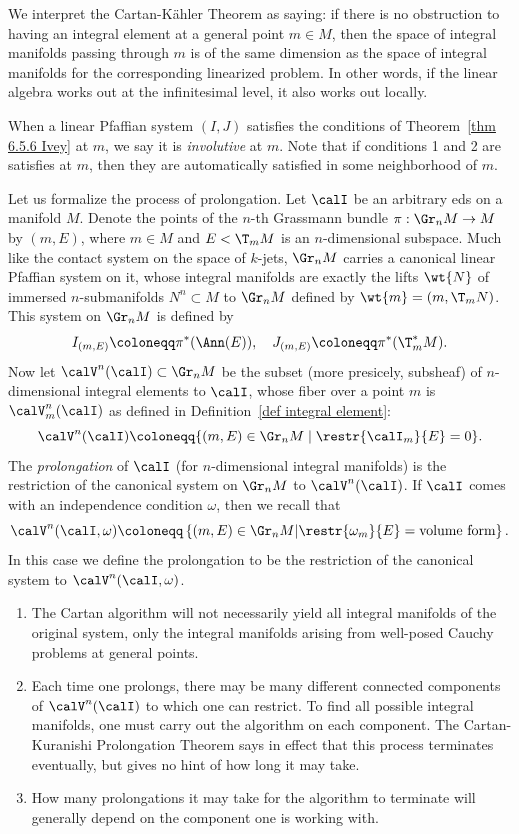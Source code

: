 We interpret the Cartan-K\"ahler Theorem as saying: if there is no obstruction to having an integral element at a general point $m\in M$, then the space of integral manifolds passing through $m$ is of the same dimension as the space of integral manifolds for the corresponding linearized problem. In other words, if the linear algebra works out at the infinitesimal level, it also works out locally.

When a linear Pfaffian system $(I,J)$ satisfies the conditions of Theorem~\ref{thm 6.5.6 Ivey} at $m$, we say it is \emph{involutive} at $m$. Note that if conditions 1 and 2 are satisfies at $m$, then they are automatically satisfied in some neighborhood of $m$.

Let us formalize the process of prolongation. Let $\calI$ be an arbitrary \gls{eds} on a manifold $M$. Denote the points of the $n$-th Grassmann bundle $\pi:\Gr_n M\to M$ by $(m,E)$, where $m\in M$ and $E<\T_mM$ is an $n$-dimensional subspace. Much like the contact system on the space of $k$-jets, $\Gr_n M$ carries a canonical linear Pfaffian system on it, whose integral manifolds are exactly the lifts $\wt{N}$ of immersed $n$-submanifolds $N^n\subset M$ to $\Gr_n M$ defined by $\wt{m}=(m,\T_m N)$. This system on $\Gr_n M$ is defined by 
\[I_{(m,E)}\coloneqq \pi^\ast(\Ann (E)),\quad J_{(m,E)}\coloneqq \pi^\ast(\T_m^\ast M).\]
Now let $\calV^n(\calI)\subset \Gr_n M$ be the subset (more presicely, subsheaf) of $n$-dimensional integral elements to $\calI$, whose fiber over a point $m$ is $\calV^n_m(\calI)$ as defined in Definition~\ref{def integral element}:
\[\calV^n(\calI)\coloneqq \{(m,E)\in \Gr_n M\mid \restr{\calI_m}{E}=0\}.\]
The \emph{prolongation} of $\calI$ (for $n$-dimensional integral manifolds) is the restriction of the canonical system on $\Gr_n M$ to $\calV^n(\calI)$.  If $\calI$ comes with an independence condition $\omega$, then we recall that 
\[\calV^n(\calI,\omega)\coloneqq \left\{(m,E)\in \Gr_n M\middle| \restr{\omega_m}{E}=\text{volume form}\right\}.\]
In this case we define the prolongation to be the restriction of the canonical system to $\calV^n(\calI,\omega)$.

\begin{rem}
    \begin{enumerate}
        \item The Cartan algorithm will not necessarily yield all integral manifolds of the original system, only the integral manifolds arising from well-posed Cauchy problems at general points.
        \item Each time one prolongs, there may be many different connected components of $\calV^n(\calI)$ to which one can restrict. To find all possible integral manifolds, one must carry out the algorithm on each component. The Cartan-Kuranishi Prolongation Theorem says in effect that this process terminates eventually, but gives no hint of how long it may take.
        \item How many prolongations it may take for the algorithm to terminate will generally depend on the component one is working with.
    \end{enumerate}
\end{rem}


